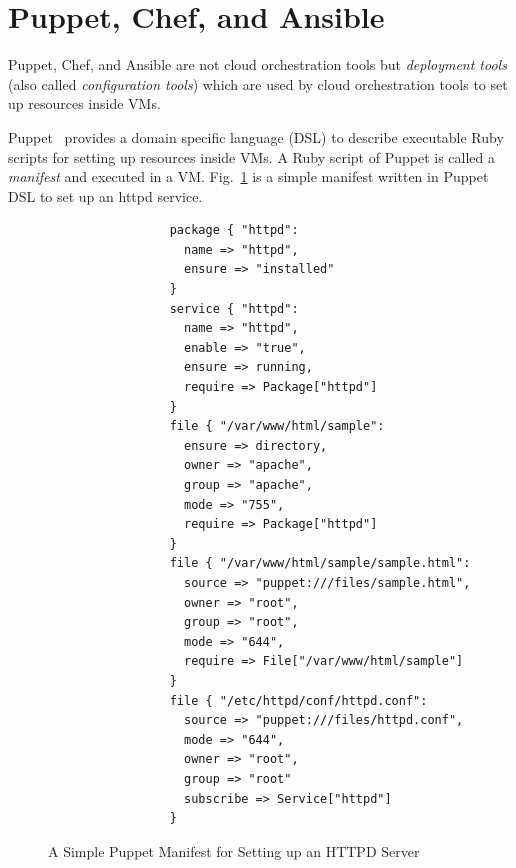 \documentclass[12pt]{report}
\begin{document}
\section{Puppet, Chef, and Ansible}
\label{sec:PCA}
Puppet, Chef, and Ansible are not cloud orchestration tools but {\it
  deployment tools} (also called {\it configuration tools}) which are
used by cloud orchestration tools to set up resources inside VMs.

Puppet~\cite{Puppet} provides a domain specific language (DSL) to
describe executable Ruby~\cite{Ruby} scripts for setting up resources inside
VMs. A Ruby script of Puppet is called a {\it manifest} and executed in a VM.
Fig.~\ref{fig:PuppetExample} is a simple manifest written in Puppet
DSL to set up an httpd service.
\begin{figure}
\small
\begin{verbatim}
                 package { "httpd":
                   name => "httpd",
                   ensure => "installed"
                 }
                 service { "httpd":
                   name => "httpd",
                   enable => "true",
                   ensure => running,
                   require => Package["httpd"]
                 }
                 file { "/var/www/html/sample":
                   ensure => directory,
                   owner => "apache",
                   group => "apache",
                   mode => "755",
                   require => Package["httpd"]
                 }
                 file { "/var/www/html/sample/sample.html":
                   source => "puppet:///files/sample.html",
                   owner => "root",
                   group => "root",
                   mode => "644",
                   require => File["/var/www/html/sample"]
                 }
                 file { "/etc/httpd/conf/httpd.conf":
                   source => "puppet:///files/httpd.conf",
                   mode => "644",
                   owner => "root",
                   group => "root"
                   subscribe => Service["httpd"]
                 }
\end{verbatim}
\normalsize
\vspace{-0.6cm}
\caption{A Simple Puppet Manifest for Setting up an HTTPD Server}
\label{fig:PuppetExample}
\end{figure}
\end{document}
